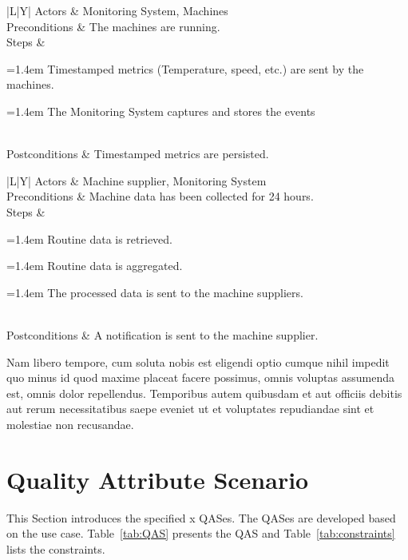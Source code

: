 \documentclass[conference]{IEEEtran}
\newcounter{ucstep}
\newenvironment{ucsteps}{%
  \begin{minipage}[t]{\linewidth}\raggedright%
  \setcounter{ucstep}{0}%
  \def\item{\par\stepcounter{ucstep}\hangindent=1.4em\hangafter=1%
    \noindent\makebox[1.4em][l]{\theucstep.}\ignorespaces}%
}{%
  \strut\end{minipage}%
}
\newcommand{\usecase}[6]{%
  \begin{table}[htbp]
    \centering
    \caption{#1: #2}
    \label{tab:#1}
    \footnotesize
    \renewcommand{\arraystretch}{1.3}%
    \begin{tabularx}{\columnwidth}{|L|Y|}
      \hline
      Actors         & #3 \\ \hline
      Preconditions  & #4 \\ \hline
      Steps          & #5 \\ \hline
      Postconditions & #6 \\ \hline
    \end{tabularx}
  \end{table}%
}
\begin{document}
\usecase{UC-6}{Logging machine metrics}
  {Monitoring System, Machines}
  {The machines are running.}
  {%
    \begin{ucsteps}
      \item Timestamped metrics (Temperature, speed, etc.) are sent by the machines.
      \item The Monitoring System captures and stores the events
    \end{ucsteps}%
  }
  {Timestamped metrics are persisted.}

\usecase{UC-7}{Sending routine data to the machine supplier}
  {Machine supplier, Monitoring System}
  {Machine data has been collected for 24 hours.}
  {%
    \begin{ucsteps}
      \item Routine data is retrieved.
      \item Routine data is aggregated.
      \item The processed data is sent to the machine suppliers.
    \end{ucsteps}%
  }
  {A notification is sent to the machine supplier.}

Nam libero tempore, cum soluta nobis est eligendi optio cumque nihil impedit quo minus id quod maxime placeat facere possimus, omnis voluptas assumenda est, omnis dolor repellendus. Temporibus autem quibusdam et aut officiis debitis aut rerum necessitatibus saepe eveniet ut et voluptates repudiandae sint et molestiae non recusandae.

\section{Quality Attribute Scenario}
\label{sec:qas}
This Section introduces the specified x QASes.
The QASes are developed based on the use case.
Table~\ref{tab:QAS} presents the QAS and Table~\ref{tab:constraints} lists the constraints.
\end{document}

